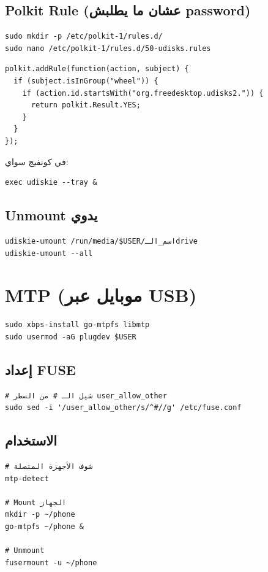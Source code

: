 \documentclass[12pt, a4paper]{report}
\begin{document}
\subsection{Polkit Rule (عشان ما يطلبش password)}
\begin{lstlisting}
sudo mkdir -p /etc/polkit-1/rules.d/
sudo nano /etc/polkit-1/rules.d/50-udisks.rules
\end{lstlisting}

\begin{lstlisting}[language={}]
polkit.addRule(function(action, subject) {
  if (subject.isInGroup("wheel")) {
    if (action.id.startsWith("org.freedesktop.udisks2.")) {
      return polkit.Result.YES;
    }
  }
});
\end{lstlisting}

في كونفيج سواي:
\begin{lstlisting}
exec udiskie --tray &
\end{lstlisting}

\subsection{Unmount يدوي}
\begin{lstlisting}
udiskie-umount /run/media/$USER/اسم_الـdrive
udiskie-umount --all
\end{lstlisting}

\section{MTP (موبايل عبر USB)}
\begin{lstlisting}
sudo xbps-install go-mtpfs libmtp
sudo usermod -aG plugdev $USER
\end{lstlisting}

\subsection{إعداد FUSE}
\begin{lstlisting}
# شيل الـ # من السطر user_allow_other
sudo sed -i '/user_allow_other/s/^#//g' /etc/fuse.conf
\end{lstlisting}

\subsection{الاستخدام}
\begin{lstlisting}
# شوف الأجهزة المتصلة
mtp-detect

# Mount الجهاز
mkdir -p ~/phone
go-mtpfs ~/phone &

# Unmount
fusermount -u ~/phone
\end{lstlisting}
\end{document}
